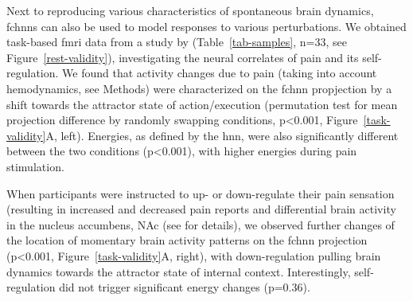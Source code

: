 \documentclass{article}
\begin{document}
Next to reproducing various characteristics of spontaneous brain dynamics, \acrshort{fchnn}s can also be used to model responses to various perturbations. We obtained task-based \acrshort{fmri} data from a study by \citet{woo2015distinct} (Table~\ref{tab-samples}, n=33, see Figure~\ref{rest-validity}), investigating the neural correlates of pain and its self-regulation.
We found that activity changes due to pain (taking into account hemodynamics, see Methods) were characterized on the \acrshort{fchnn} propjection by a shift towards the attractor state of action/execution (permutation test for mean projection difference by randomly swapping conditions, p\textless 0.001, Figure~\ref{task-validity}A, left). Energies, as defined by the \acrshort{hnn}, were also significantly different between the two conditions (p\textless 0.001), with higher energies during pain stimulation.

When participants were instructed to up- or down-regulate their pain sensation (resulting in increased and decreased pain reports and differential brain activity in the nucleus accumbens, NAc (see \cite{woo2015distinct} for details), we observed further changes of the location of momentary brain activity patterns on the \acrshort{fchnn} projection (p\textless 0.001, Figure~\ref{task-validity}A, right), with down-regulation pulling brain dynamics towards the attractor state of internal context. Interestingly, self-regulation did not trigger significant energy changes (p=0.36).
\end{document}
